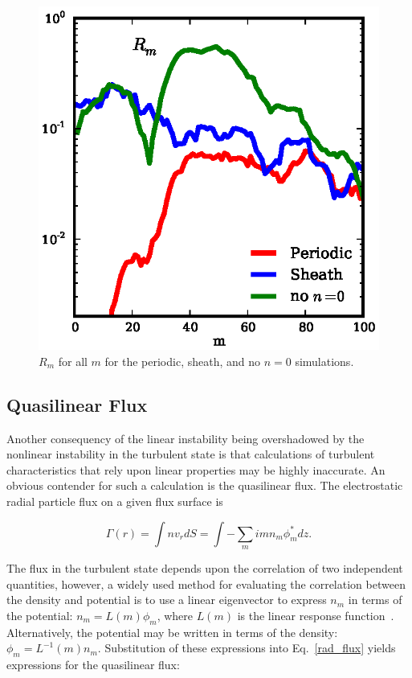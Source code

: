 \documentclass[showpacs,preprintnumbers,amsmath,amssymb,superscriptaddress,aip]{revtex4-1}
\def\beq{\begin{equation}}
\def\eeq{\end{equation}}
\begin{document}
\begin{figure}[!htbp]
\includegraphics[]{ratios}
\hfil
\caption{$R_m$ for all $m$ for the periodic, sheath, and no $n=0$ simulations.}
\label{ratios}
\end{figure}


\subsection{Quasilinear Flux}
\label{subsec_quasilinear}

Another consequency of the linear instability being overshadowed by the nonlinear instability in the turbulent state is that 
calculations of turbulent characteristics that rely upon linear properties may be
highly inaccurate. An obvious contender for such a calculation is the quasilinear flux.
The electrostatic radial particle flux on a given flux surface is

\beq
\label{rad_flux}
\Gamma(r) = \int n v_r dS = \int - \sum_m i m n_m \phi_m^* dz.
\eeq

The flux in the turbulent state depends upon the correlation of two independent quantities, however, a widely used method for evaluating the correlation between the density and potential is
to use a linear eigenvector to express $n_m$ in terms of the potential: $n_m = L(m) \phi_m$, where $L(m)$ is the linear response function~\cite{terry2006a}. Alternatively, the potential
may be written in terms of the density: $\phi_m = L^{-1}(m) n_m$.
Substitution of these expressions into Eq.~\ref{rad_flux} yields expressions for the quasilinear flux:
\end{document}
